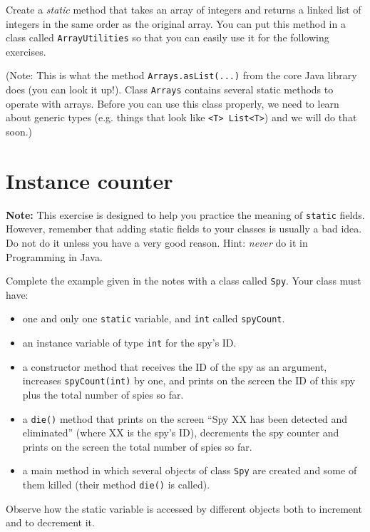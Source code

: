 \documentclass{article}
\begin{document}
Create a \emph{static} method that takes an array of integers and returns a
linked list of integers in the same order as the original array. You
can put this method in a class called \verb+ArrayUtilities+ so that you
can easily use it for the following exercises. 

(Note: This is what the method \verb+Arrays.asList(...)+ from the core
Java library does (you can look it up!). Class \verb+Arrays+ contains
several static methods to operate with arrays. Before you can use this
class properly, we need to learn about generic types (e.g. things that
look like \verb+<T> List<T>+) and we will do that soon.)

\section{Instance counter}
\label{sec:instance-counter}

{\bf Note:} This exercise is designed to help you practice the meaning of
\verb+static+ fields. However, remember that adding static fields to your
classes is usually a bad idea. Do not do it unless you have a very
good reason. Hint: \emph{never} do it in Programming in Java. 

\vspace{1em}

Complete the example given in the notes with a class called
\verb+Spy+. Your class must have: 

\begin{itemize}
\item one and only one \verb+static+ variable, and \verb+int+ called
  \verb+spyCount+.
\item an instance variable of type \verb+int+ for the spy's ID.
\item a constructor method that receives
  the ID of the spy as an argument, increases
  \verb+spyCount(int)+ by one, 
  and prints on the screen the ID of this spy plus the total number of
  spies so far.
\item a \verb+die()+ method that prints on the screen ``Spy XX has
  been detected and eliminated'' (where XX is the spy's ID), 
  decrements the spy counter and prints
  on the screen the total number of spies so far. 
\item a main method in which several objects of class \verb+Spy+ are
  created and some of them killed (their method \verb+die()+ is
  called). 
\end{itemize}

Observe how the static variable is accessed by different objects both
to increment and to decrement it. 
\end{document}
